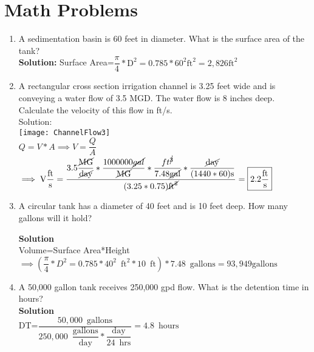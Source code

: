 \documentclass{article}
\begin{document}
\section{Math Problems}
\begin{enumerate}
\item A sedimentation basin is 60 feet in diameter. What is the surface area of the tank?\\

\textbf{Solution:}
\vspace{0.2cm}
Surface Area=$\dfrac{\pi}{4}*\mathrm{D}^2=0.785*60^2 \mathrm{ft}^2 =\boxed{2,826 \mathrm{ft}^2}$
\vspace{0.2cm}


\item A rectangular cross section irrigation channel is 3.25 feet wide and is conveying a water flow of 3.5 MGD. The water flow is 8 inches deep. Calculate the velocity of this flow in ft/s.\\
Solution:\\
\vspace{0.3cm}
\texttt{[image: ChannelFlow3]}\\
$Q=V*A \implies V=\dfrac{Q}{A}$\\
$\implies \mathrm{V}\dfrac{\mathrm{ft}}{\mathrm{s}}=\dfrac{3.5\dfrac{\cancel{\mathrm{MG}}}{\cancel{\mathrm{day}}}*\dfrac{1000000\cancel{gal}}{\cancel{\mathrm{MG}}}*\dfrac{ft^{\cancel{3}}}{7.48\cancel{\mathrm{gal}}}*\dfrac{\cancel{\mathrm{day}}}{(1440*60)\mathrm{s}}}{(3.25*0.75)\cancel{\mathrm{ft}^2}}=\boxed{2.2\dfrac{\mathrm{ft}}{\mathrm{s}}}$
\vspace{0.5cm}

\item A circular tank has a diameter of 40 feet and is 10 feet deep. How many gallons will it hold?

\textbf{Solution}\\
Volume=Surface Area*Height$\implies (\dfrac{\pi}{4}*D^2=0.785*40^2 \mathrm{\enspace ft}^2 * 10 \mathrm{\enspace ft})*7.48 \mathrm{\enspace gallons} =\boxed{93,949 \mathrm{gallons}}$


\item A 50,000 gallon tank receives 250,000 gpd flow. What is the detention time in hours?\\

\textbf{Solution}\\

\vspace{0.2cm}
DT=$\dfrac{50,000 \enspace \mathrm{gallons}}{250,000 \enspace \dfrac{\mathrm{gallons}}{\mathrm{day}}*\dfrac{\mathrm{day}}{24 \enspace \mathrm{hrs}}}=\boxed{4.8 \enspace \mathrm{hours}}$\\
\vspace{0.2cm}


\end{enumerate}
\end{document}
